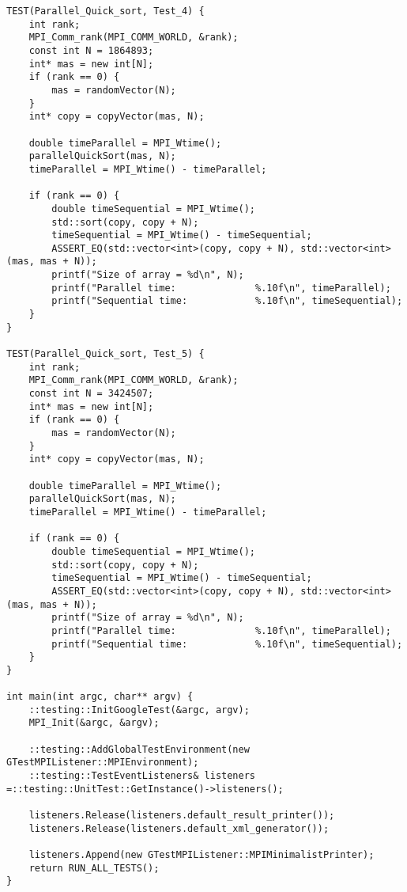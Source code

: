 \documentclass{report}
\begin{document}
\begin{lstlisting}
TEST(Parallel_Quick_sort, Test_4) {
    int rank;
    MPI_Comm_rank(MPI_COMM_WORLD, &rank);
    const int N = 1864893;
    int* mas = new int[N];
    if (rank == 0) {
        mas = randomVector(N);
    }
    int* copy = copyVector(mas, N);

    double timeParallel = MPI_Wtime();
    parallelQuickSort(mas, N);
    timeParallel = MPI_Wtime() - timeParallel;

    if (rank == 0) {
        double timeSequential = MPI_Wtime();
        std::sort(copy, copy + N);
        timeSequential = MPI_Wtime() - timeSequential;
        ASSERT_EQ(std::vector<int>(copy, copy + N), std::vector<int>(mas, mas + N));
        printf("Size of array = %d\n", N);
        printf("Parallel time:              %.10f\n", timeParallel);
        printf("Sequential time:            %.10f\n", timeSequential);
    }
}

TEST(Parallel_Quick_sort, Test_5) {
    int rank;
    MPI_Comm_rank(MPI_COMM_WORLD, &rank);
    const int N = 3424507;
    int* mas = new int[N];
    if (rank == 0) {
        mas = randomVector(N);
    }
    int* copy = copyVector(mas, N);

    double timeParallel = MPI_Wtime();
    parallelQuickSort(mas, N);
    timeParallel = MPI_Wtime() - timeParallel;

    if (rank == 0) {
        double timeSequential = MPI_Wtime();
        std::sort(copy, copy + N);
        timeSequential = MPI_Wtime() - timeSequential;
        ASSERT_EQ(std::vector<int>(copy, copy + N), std::vector<int>(mas, mas + N));
        printf("Size of array = %d\n", N);
        printf("Parallel time:              %.10f\n", timeParallel);
        printf("Sequential time:            %.10f\n", timeSequential);
    }
}

int main(int argc, char** argv) {
    ::testing::InitGoogleTest(&argc, argv);
    MPI_Init(&argc, &argv);

    ::testing::AddGlobalTestEnvironment(new GTestMPIListener::MPIEnvironment);
    ::testing::TestEventListeners& listeners =::testing::UnitTest::GetInstance()->listeners();

    listeners.Release(listeners.default_result_printer());
    listeners.Release(listeners.default_xml_generator());

    listeners.Append(new GTestMPIListener::MPIMinimalistPrinter);
    return RUN_ALL_TESTS();
}
\end{lstlisting}
\end{document}
